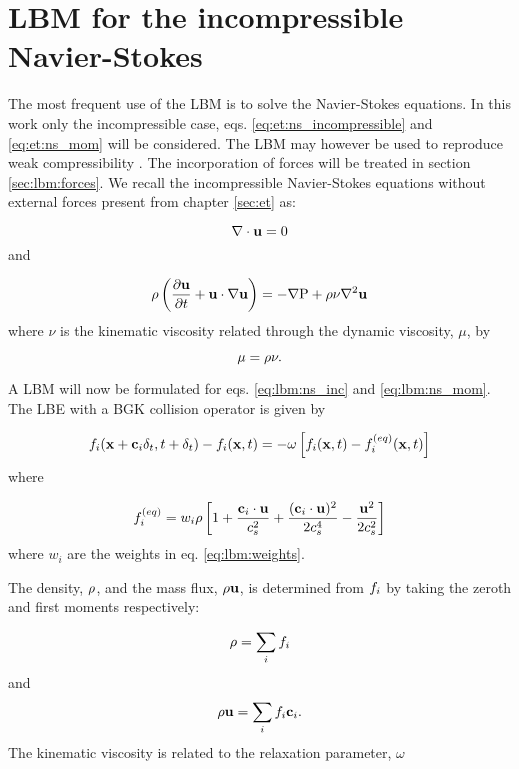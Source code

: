 \section{LBM for the incompressible Navier-Stokes}\label{sec:lbm:ns}
The most frequent use of the LBM is to solve the Navier-Stokes
equations. In this work only the incompressible case,
eqs. \eqref{eq:et:ns_incompressible} and \eqref{eq:et:ns_mom} will be
considered. The LBM may however be used to reproduce weak
compressibility \cite{wolf-gladrow}. The incorporation of forces will
be treated in section \ref{sec:lbm:forces}. We recall the
incompressible Navier-Stokes equations without external forces present
from chapter \ref{sec:et} as:

\begin{equation}\label{eq:lbm:ns_inc}
 \nabla \cdot \mathbf{u} = 0
\end{equation}
and

\begin{equation}\label{eq:lbm:ns_mom}
\mathrm{\rho} \left (\dfrac{\partial \mathbf{u}}{\partial t} +
  \mathbf{u} \cdot \nabla \mathbf{u} 
  \right ) = - \nabla \mathrm{P}  + \mathrm{\rho} \nu \nabla^2 \mathbf{u}
\end{equation}
where $\nu$ is the kinematic viscosity related through the
dynamic viscosity, $\mu$, by

\begin{equation}
\mu = \mathrm{\rho} \nu.
\end{equation}

A LBM will now be formulated for eqs. \eqref{eq:lbm:ns_inc} and
\eqref{eq:lbm:ns_mom}. The LBE with a BGK collision operator is given
by

\begin{equation}
f_i(\mathbf{x} + \mathbf{c}_i\delta_t, t + \delta_t) - f_i(\mathbf{x}, t) = -\omega \left[ f_i(\mathbf{x}, t) - f_i^{(eq)}(\mathbf{x}, t) \right]
\end{equation}
where

\begin{equation}\label{eq:lbm:ns_eq}
f_i^{(eq)} = w_i\rho \left [ 1 + \frac{\mathbf{c}_i \cdot \mathbf{u}}{c_s^2} +
  \frac{(\mathbf{c}_i \cdot \mathbf{u})^2}{2c_s^4} - \frac{\mathbf{u}^2}{2c_s^2} \right]
\end{equation}
where $w_i$ are the weights in eq. \eqref{eq:lbm:weights}.

The density, $\mathrm{\rho}$, and the mass flux, $\mathrm{\rho} \mathbf{u}$, is determined
from $f_i$ by taking the zeroth and first moments respectively:

\begin{equation}\label{eq:lbm:rho_mom}
\mathrm{\rho} = \sum_i f_i
\end{equation}
and
\begin{equation}\label{eq:lbm:j_mom}
\mathrm{\rho} \mathbf{u} = \sum_i f_i \mathbf{c}_i .
\end{equation}
The kinematic viscosity is related to the relaxation parameter,
$\omega$

